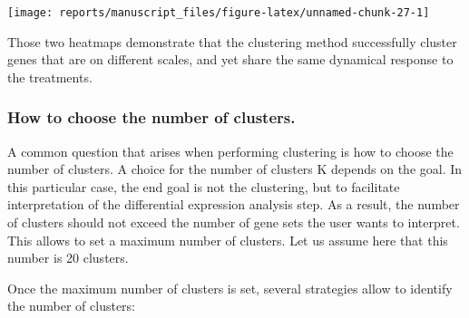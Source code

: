 \documentclass[9pt,a4paper,]{extarticle}
\newenvironment{Shaded}{\begin{snugshade}}{\end{snugshade}}
\newcommand{\CommentTok}[1]{\textcolor[rgb]{0.56,0.35,0.01}{\textit{#1}}}
\newcommand{\DataTypeTok}[1]{\textcolor[rgb]{0.13,0.29,0.53}{#1}}
\newcommand{\DecValTok}[1]{\textcolor[rgb]{0.00,0.00,0.81}{#1}}
\newcommand{\KeywordTok}[1]{\textcolor[rgb]{0.13,0.29,0.53}{\textbf{#1}}}
\newcommand{\NormalTok}[1]{#1}
\newcommand{\OperatorTok}[1]{\textcolor[rgb]{0.81,0.36,0.00}{\textbf{#1}}}
\newcommand{\OtherTok}[1]{\textcolor[rgb]{0.56,0.35,0.01}{#1}}
\newcommand{\StringTok}[1]{\textcolor[rgb]{0.31,0.60,0.02}{#1}}
\begin{document}
\begin{Shaded}
\end{Shaded}

\begin{center}\texttt{[image: reports/manuscript\_files/figure-latex/unnamed-chunk-27-1]} \end{center}

Those two heatmaps demonstrate that the clustering method successfully cluster
genes that are on different scales, and yet share the same dynamical response
to the treatments.

\hypertarget{how-to-choose-the-number-of-clusters.}{%
\subsubsection{How to choose the number of clusters.}\label{how-to-choose-the-number-of-clusters.}}

A common question that arises when performing clustering is how to choose the
number of clusters. A choice for the number of clusters K depends on the goal.
In this particular case, the end goal is not the clustering, but to facilitate
interpretation of the differential expression analysis step. As a result, the
number of clusters should not exceed the number of gene sets the user wants to
interpret. This allows to set a maximum number of clusters. Let us assume here
that this number is 20 clusters.

Once the maximum number of clusters is set, several strategies allow to
identify the number of clusters:
\end{document}
